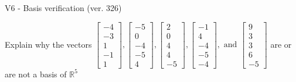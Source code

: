 \begin{exercise}
  \begin{exerciseTitle}V6 - Basis verification (ver. 326)\end{exerciseTitle}
  \begin{exerciseStatement}
    Explain why the vectors \(\left[\begin{array}{r}
-4 \\
-3 \\
1 \\
-1 \\
1
\end{array}\right] , \left[\begin{array}{r}
-5 \\
0 \\
-4 \\
-5 \\
4
\end{array}\right] , \left[\begin{array}{r}
2 \\
0 \\
4 \\
4 \\
-5
\end{array}\right] , \left[\begin{array}{r}
-1 \\
4 \\
-4 \\
-5 \\
-4
\end{array}\right] , \text{ and } \left[\begin{array}{r}
9 \\
3 \\
3 \\
6 \\
-5
\end{array}\right]\) are or are not a basis of \(\mathbb{R}^5\)	



\end{exerciseStatement}
\end{exercise}
